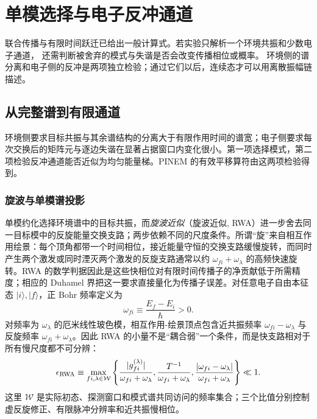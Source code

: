 \chapter{单模选择与电子反冲通道}\label{chap:electron-recoil-channels}

联合传播与有限时间跃迁已给出一般计算式。若实验只解析一个环境共振和少数电子通道，
还需判断被舍弃的模式与失谐是否会改变传播相位或概率。
环境侧的谱分离和电子侧的反冲是两项独立检验；通过它们以后，连续态才可以用离散振幅链描述。

\section{从完整谱到有限通道}

环境侧要求目标共振与其余谱结构的分离大于有限作用时间的谱宽；电子侧要求每次交换后的矩阵元与逐边失谐在显著占据窗口内变化很小。第一项选择模式，第二项检验反冲通道能否近似为均匀能量梯。PINEM 的有效平移算符由这两项检验得到。

\subsection{旋波与单模谱投影}

单模约化选择环境谱中的目标共振，而\emph{旋波近似}（旋波近似, RWA）进一步舍去同一目标模中的反旋能量交换支路；两步依赖不同的尺度条件。所谓“旋”来自相互作用绘景：每个顶角都带一个时间相位，接近能量守恒的交换支路缓慢旋转，而同时产生两个激发或同时湮灭两个激发的反旋支路通常以约 $\omega_{fi}+\omega_\lambda$ 的高频快速旋转。RWA 的数学判据因此是这些快相位对有限时间传播子的净贡献低于所需精度；相应的 Duhamel 界把这一要求直接量化为传播子误差。对任意电子自由本征态 $|i\rangle,|f\rangle$，正 Bohr 频率定义为
\begin{equation*}
\omega_{fi}\equiv\frac{E_f-E_i}{\hbar}>0.
\end{equation*}
对频率为 $\omega_\lambda$ 的厄米线性玻色模，相互作用-绘景顶点包含近共振频率 $\omega_{fi}-\omega_\lambda$ 与反旋频率 $\omega_{fi}+\omega_\lambda$。因此 RWA 的小量不是“耦合弱”一个条件，而是快支路相对于所有慢尺度都不可分辨：
\begin{equation}
{
\epsilon_{\rm RWA}
\equiv
\max_{fi,\lambda\in\mathcal W}
\left\{
\frac{|g_{fi}^{(\lambda)}|}{\omega_{fi}+\omega_\lambda},
\frac{T^{-1}}{\omega_{fi}+\omega_\lambda},
\frac{|\omega_{fi}-\omega_\lambda|}{\omega_{fi}+\omega_\lambda}
\right\}\ll1 .}
\label{eq:general_rwa_control_parameter}
\end{equation}
这里 $\mathcal W$ 是实际初态、探测窗口和模式谱共同访问的频率集合；三个比值分别控制虚反旋修正、有限脉冲分辨率和近共振慢相位。

